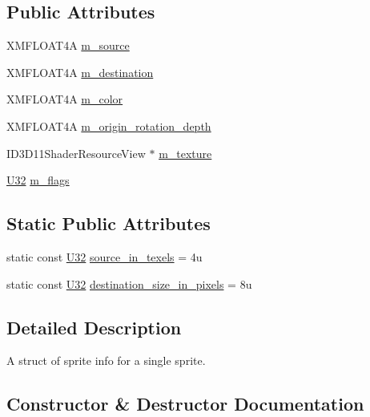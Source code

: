 \subsection*{Public Attributes}
\begin{DoxyCompactItemize}
\item 
X\+M\+F\+L\+O\+A\+T4A \hyperlink{structmage_1_1_sprite_info_a15e373b0b7edf90e512a4a0f665c810f}{m\+\_\+source}
\item 
X\+M\+F\+L\+O\+A\+T4A \hyperlink{structmage_1_1_sprite_info_a40a00e6cf76fc333309d706f064deed8}{m\+\_\+destination}
\item 
X\+M\+F\+L\+O\+A\+T4A \hyperlink{structmage_1_1_sprite_info_ab76316069522fc10f9580b705406ed16}{m\+\_\+color}
\item 
X\+M\+F\+L\+O\+A\+T4A \hyperlink{structmage_1_1_sprite_info_ae8026876747e7b5924d6940551895ccd}{m\+\_\+origin\+\_\+rotation\+\_\+depth}
\item 
I\+D3\+D11\+Shader\+Resource\+View $\ast$ \hyperlink{structmage_1_1_sprite_info_aea9963f991406a050bc5759fb05cfd5e}{m\+\_\+texture}
\item 
\hyperlink{namespacemage_a41c104c036fba3756a74e19f793eeaa1}{U32} \hyperlink{structmage_1_1_sprite_info_a9f3802944651a58e02831e5f2cb4a53e}{m\+\_\+flags}
\end{DoxyCompactItemize}
\subsection*{Static Public Attributes}
\begin{DoxyCompactItemize}
\item 
static const \hyperlink{namespacemage_a41c104c036fba3756a74e19f793eeaa1}{U32} \hyperlink{structmage_1_1_sprite_info_afe8aa37311d56f8411cfe878607f6f68}{source\+\_\+in\+\_\+texels} = 4u
\item 
static const \hyperlink{namespacemage_a41c104c036fba3756a74e19f793eeaa1}{U32} \hyperlink{structmage_1_1_sprite_info_a84baaa1612a26bcc076965c0997641c3}{destination\+\_\+size\+\_\+in\+\_\+pixels} = 8u
\end{DoxyCompactItemize}


\subsection{Detailed Description}
A struct of sprite info for a single sprite. 

\subsection{Constructor \& Destructor Documentation}
\hypertarget{structmage_1_1_sprite_info_a95544c5b70d30b273a482139c4299be0}{}\label{structmage_1_1_sprite_info_a95544c5b70d30b273a482139c4299be0} 
